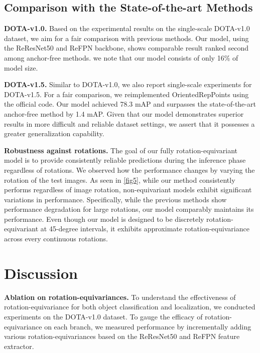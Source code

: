 \documentclass[letterpaper]{article} %
\begin{document}
\subsection{Comparison with the State-of-the-art Methods}
\textbf{DOTA-v1.0.} Based on the experimental results on the single-scale DOTA-v1.0 dataset, we aim for a fair comparison with previous methods. Our model, using the ReResNet50 and ReFPN backbone, shows comparable result ranked second among anchor-free methods. we note that our model consists of only 16\% of model size.

\noindent\textbf{DOTA-v1.5.} Similar to DOTA-v1.0, we also report single-scale experiments for DOTA-v1.5. For a fair comparison, we reimplemented OrientedRepPoints using the official code. Our model achieved 78.3 mAP and surpasses the state-of-the-art anchor-free method by 1.4 mAP. Given that our model demonstrates superior results in more difficult and reliable dataset settings, we assert that it possesses a greater generalization capability.

\noindent\textbf{Robustness against rotations.} The goal of our fully rotation-equivariant model is to provide consistently reliable predictions during the inference phase regardless of rotations. We observed how the performance changes by varying the rotation of the test images. As seen in \cref{fig5}, while our method consistently performs regardless of image rotation, non-equivariant models exhibit significant variations in performance. Specifically, while the previous methods show performance degradation for large rotations, our model comparably maintains its performance. Even though our model is designed to be discretely rotation-equivariant at 45-degree intervals, it exhibits approximate rotation-equivariance across every continuous rotations. 

\section{Discussion}
\noindent\textbf{Ablation on rotation-equivariances.}
 To understand the effectiveness of rotation-equivariance for both object classification and localization, we conducted experiments on the DOTA-v1.0 dataset. To gauge the efficacy of rotation-equivariance on each branch, we measured performance by incrementally adding various rotation-equivariances based on the ReResNet50 and ReFPN feature extractor.
 
\end{document}
